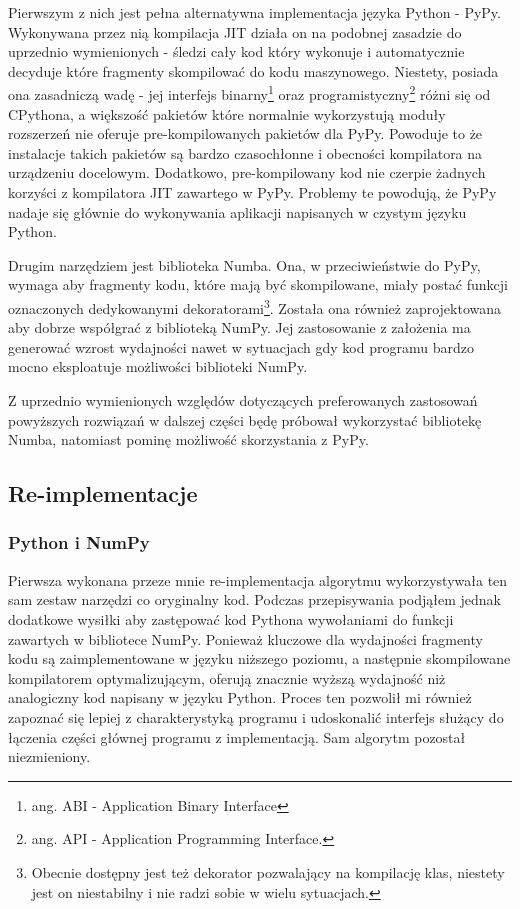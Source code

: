 \documentclass[10pt, a4paper]{article}
\begin{document}
\begin{sloppypar}
    Pierwszym z nich jest pełna alternatywna implementacja języka Python - PyPy\cite{PyPy_Home_Page}.
    Wykonywana przez nią kompilacja JIT działa on na podobnej zasadzie do uprzednio wymienionych
    - śledzi cały kod który wykonuje i automatycznie decyduje które fragmenty skompilować
    do kodu maszynowego\cite{PyPy_JIT}. Niestety, posiada ona zasadniczą wadę - jej
    interfejs binarny\footnote{ang. ABI - Application Binary Interface} oraz programistyczny\footnote{ang.
    API - Application Programming Interface.} różni się od CPythona, a większość
    pakietów które normalnie wykorzystują moduły rozszerzeń nie oferuje pre-kompilowanych
    pakietów dla PyPy. Powoduje to że instalacje takich pakietów są bardzo czasochłonne i
    obecności kompilatora na urządzeniu docelowym. Dodatkowo, pre-kompilowany kod nie czerpie
    żadnych korzyści z kompilatora JIT zawartego w PyPy. Problemy te powodują, że PyPy nadaje
    się głównie do wykonywania aplikacji napisanych w czystym języku Python.

    Drugim narzędziem jest biblioteka Numba\cite{Numba_Article}\cite{Numba_Doc}. Ona, w przeciwieństwie
    do PyPy, wymaga aby fragmenty kodu, które mają być skompilowane, miały postać
    funkcji oznaczonych dedykowanymi dekoratorami\footnote{Obecnie dostępny jest też dekorator
    pozwalający na kompilację klas, niestety jest on niestabilny i nie radzi sobie w
    wielu sytuacjach.}. Została ona również zaprojektowana aby dobrze współgrać z biblioteką
    NumPy. Jej zastosowanie z założenia ma generować wzrost wydajności nawet w
    sytuacjach gdy kod programu bardzo mocno eksploatuje możliwości biblioteki NumPy.

    Z uprzednio wymienionych względów dotyczących preferowanych zastosowań powyższych
    rozwiązań w dalszej części będę próbował wykorzystać bibliotekę Numba, natomiast pominę
    możliwość skorzystania z PyPy.

    \newpage


    \subsection{Re-implementacje}


    \subsubsection{ Python i NumPy }


    Pierwsza wykonana przeze mnie re-implementacja algorytmu wykorzystywała ten sam zestaw
    narzędzi co oryginalny kod. Podczas przepisywania podjąłem jednak dodatkowe wysiłki
    aby zastępować kod Pythona wywołaniami do funkcji zawartych w bibliotece NumPy. Ponieważ
    kluczowe dla wydajności fragmenty kodu są zaimplementowane w języku niższego poziomu,
    a następnie skompilowane kompilatorem optymalizującym, oferują znacznie wyższą wydajność
    niż analogiczny kod napisany w języku Python. Proces ten pozwolił mi również
    zapoznać się lepiej z charakterystyką programu i udoskonalić interfejs służący do
    łączenia części głównej programu z implementacją. Sam algorytm pozostał niezmieniony.


\end{sloppypar}
\end{document}
